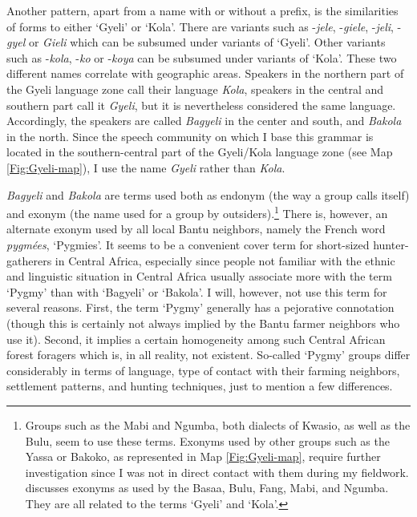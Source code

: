 Another pattern, apart from a name with or without a prefix, is the similarities of forms to either `Gyeli' or `Kola'. There are variants such as -{\itshape jele}, -{\itshape giele}, -{\itshape jeli}, -{\itshape gyel} or {\itshape Gieli} which can be subsumed under variants of `Gyeli'. Other variants such as -{\itshape kola}, -{\itshape ko} or -{\itshape koya} can be subsumed under variants of `Kola'. %
These two different names correlate with geographic areas. 
Speakers in the northern part of the Gyeli language zone call their language {\itshape Kola}, speakers in the central and southern part call it {\itshape Gyeli}, but it is nevertheless considered the same language. Accordingly, the speakers are called {\itshape Bagyeli} in the center and south, and {\itshape Bakola} in the north. Since the speech community on which I base this grammar is located in the southern-central part of the Gyeli/Kola language zone (see Map \ref{Fig:Gyeli-map}), I use the name {\itshape Gyeli} rather than {\itshape Kola}.

{\itshape Bagyeli} and {\itshape Bakola} are terms used both as endonym (the way a group calls itself) and exonym (the name used for a group by outsiders).\footnote{Groups such as the Mabi and Ngumba, both dialects of Kwasio, as well as the Bulu, seem to use these terms. Exonyms used by other groups such as the Yassa or Bakoko, as represented in Map \ref{Fig:Gyeli-map}, require further investigation since I was not in direct contact with them during my fieldwork. \citet[29-30]{renaud76} discusses exonyms as used by the Basaa, Bulu, Fang, Mabi, and Ngumba. They are all related to the terms `Gyeli' and `Kola'.} There is, however, an alternate exonym used by all local Bantu neighbors, namely the French word \textit{pygmées}, `Pygmies'. It seems to be a convenient cover term for short-sized hunter-gatherers in Central Africa, especially since people not familiar with the ethnic and linguistic situation in Central Africa usually associate more with the term `Pygmy' than with `Bagyeli' or `Bakola'. I will, however, not use this term for several reasons. First, the term `Pygmy' generally has a pejorative connotation (though this is certainly not always implied by the Bantu farmer neighbors who use it). Second, it implies a certain homogeneity among such Central African forest foragers which is, in all reality, not existent. So-called `Pygmy' groups differ considerably in terms of language, type of contact with their farming neighbors, settlement patterns, and hunting techniques, just to mention a few differences.

